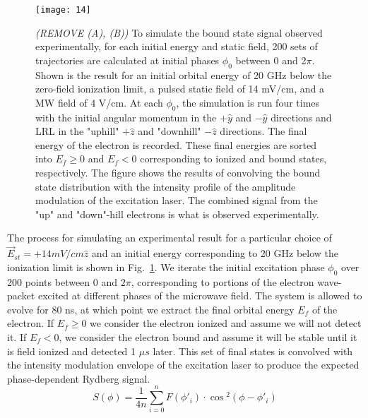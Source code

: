 \documentclass[aps,pra,preprint,groupedaddress]{revtex4-1}
\begin{document}
\begin{figure}
	\texttt{[image: 14]}
	\caption{\emph{(REMOVE (A), (B))} To simulate the bound state signal observed experimentally, for each initial energy and static field, 200 sets of trajectories are calculated at initial phases $\phi_0$ between 0 and 2$\pi$. Shown is the result for an initial orbital energy of 20 GHz below the zero-field ionization limit, a pulsed static field of 14 mV/cm, and a MW field of 4 V/cm. At each $\phi_0$, the simulation is run four times with the initial angular momentum in the $+\hat{y}$ and $-\hat{y}$ directions and LRL in the "uphill" $+\hat{z}$ and "downhill" $-\hat{z}$ directions. The final energy of the electron is recorded. These final energies are sorted into $E_f\geq 0$ and $E_f<0$ corresponding to ionized and bound states, respectively. The figure shows the results of convolving the bound state distribution with the intensity profile of the amplitude modulation of the excitation laser. The combined signal from the "up" and "down"-hill electrons is what is observed experimentally.}
	\label{fig:ModEval}
\end{figure}

The process for simulating an experimental result for a particular choice of $\vec{E}_{st} = + 14 mV/cm \hat{z}$ and an initial energy corresponding to 20 GHz below the ionization limit is shown in Fig.~\ref{fig:ModEval}. We iterate the initial excitation phase $\phi_0$ over 200 points between 0 and $2\pi$, corresponding to portions of the electron wave-packet excited at different phases of the microwave field. The system is allowed to evolve for 80 ns, at which point we extract the final orbital energy $E_f$ of the electron. If $E_f \geq 0$ we consider the electron ionized and assume we will not detect it. If $E_f < 0$, we consider the electron bound and assume it will be stable until it is field ionized and detected 1 $\mu s$ later. This set of final states is convolved with the intensity modulation envelope of the excitation laser to produce the expected phase-dependent Rydberg signal.
\begin{equation}
S(\phi) = \frac{1}{4n} \sum_{i=0}^{n} F(\phi\prime_i) \cdot \cos{^2(\phi - \phi\prime_i)}
\end{equation}
\end{document}
